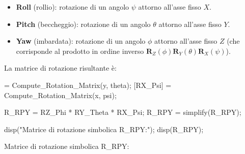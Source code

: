 \documentclass[11pt, a4paper]{article}
\begin{document}
\begin{itemize}
\setlength{\itemsep}{-1ex}
   \item{\begin{flushleft} \textbf{Roll} (rollio): rotazione di un angolo $\psi$ attorno all'asse fisso $X$. \end{flushleft}}
   \item{\begin{flushleft} \textbf{Pitch} (beccheggio): rotazione di un angolo $\theta$ attorno all'asse fisso $Y$. \end{flushleft}}
   \item{\begin{flushleft} \textbf{Yaw} (imbardata): rotazione di un angolo $\phi$ attorno all'asse fisso $Z$ (che corrisponde al prodotto in ordine inverso $\mathbf{R}_Z(\phi)\mathbf{R}_Y(\theta)\mathbf{R}_X(\psi)$). \end{flushleft}}
\end{itemize}

\begin{par}
\begin{flushleft}
La matrice di rotazione risultante è:
\end{flushleft}
\end{par}

\begin{matlabcode}
[RY_Theta] = Compute_Rotation_Matrix(y, theta);
[RX_Psi] = Compute_Rotation_Matrix(x, psi);

R_RPY = RZ_Phi * RY_Theta * RX_Psi;
R_RPY = simplify(R_RPY);

disp("Matrice di rotazione simbolica R_RPY:");
disp(R_RPY);
\end{matlabcode}
\begin{matlaboutput}
Matrice di rotazione simbolica R_RPY:
\end{matlaboutput}
\end{document}
